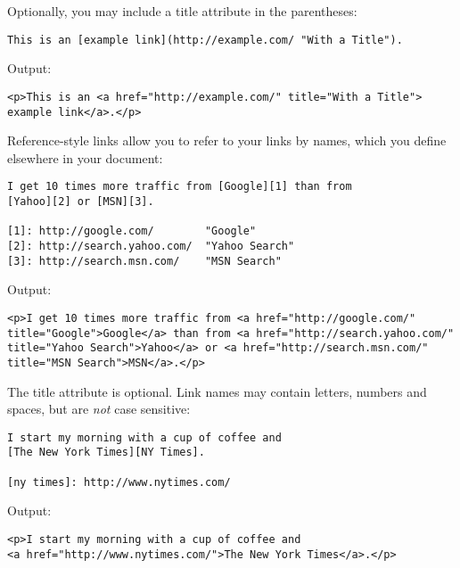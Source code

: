 Optionally, you may include a title attribute in the parentheses:

\begin{lstlisting}
This is an [example link](http://example.com/ "With a Title").
\end{lstlisting}




Output:

\begin{lstlisting}
<p>This is an <a href="http://example.com/" title="With a Title">
example link</a>.</p>
\end{lstlisting}




Reference-style links allow you to refer to your links by names, which
you define elsewhere in your document:

\begin{lstlisting}
I get 10 times more traffic from [Google][1] than from
[Yahoo][2] or [MSN][3].

[1]: http://google.com/        "Google"
[2]: http://search.yahoo.com/  "Yahoo Search"
[3]: http://search.msn.com/    "MSN Search"
\end{lstlisting}




Output:

\begin{lstlisting}
<p>I get 10 times more traffic from <a href="http://google.com/"
title="Google">Google</a> than from <a href="http://search.yahoo.com/"
title="Yahoo Search">Yahoo</a> or <a href="http://search.msn.com/"
title="MSN Search">MSN</a>.</p>
\end{lstlisting}




The title attribute is optional. Link names may contain letters,
numbers and spaces, but are \emph{not} case sensitive:

\begin{lstlisting}
I start my morning with a cup of coffee and
[The New York Times][NY Times].

[ny times]: http://www.nytimes.com/
\end{lstlisting}




Output:

\begin{lstlisting}
<p>I start my morning with a cup of coffee and
<a href="http://www.nytimes.com/">The New York Times</a>.</p>
\end{lstlisting}


